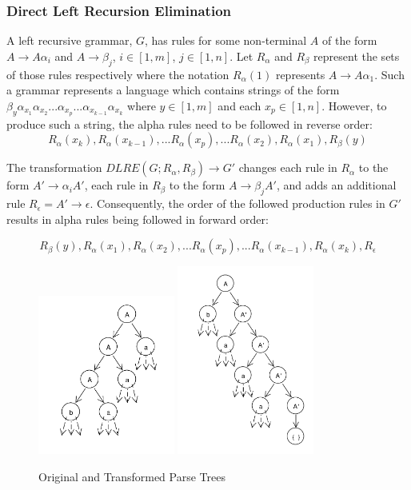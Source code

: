 \documentclass[11pt]{article}
\begin{document}
\subsubsection{Direct Left Recursion Elimination}
A left recursive grammar, $G$, has rules for some non-terminal $A$ of the form
$A \rightarrow A \alpha_i$ and $A \rightarrow \beta_j$, $i \in [1,m]$, $j \in [1,n]$.
Let $R_\alpha$ and $R_\beta$ represent the sets of those rules respectively where the notation
$R_\alpha(1)$ represents $A \rightarrow A \alpha_1$. 
Such a grammar represents a language which contains strings of the form
$\beta_y \alpha_{x_1} \alpha_{x_2} ... \alpha_{x_p}...\alpha_{x_{k-1}} \alpha_{x_k}$ where $y \in [1,m]$ and each $x_p \in [1,n]$.
However, to produce such a string, the alpha rules need to be followed in reverse order:
\[R_\alpha(x_k), R_\alpha(x_{k-1}), ... R_\alpha(x_{p}), ... R_\alpha(x_2), R_\alpha(x_1), R_\beta(y)\]

The transformation \cite{aho} $DLRE(G; R_\alpha, R_\beta) \rightarrow G'$ changes
each rule in $R_\alpha$ to the form $A' \rightarrow \alpha_i A'$, each rule
in $R_\beta$ to the form $A \rightarrow \beta_j A'$, and adds an additional rule
$R_\epsilon = A' \rightarrow \epsilon$. Consequently, the order of the followed production
rules in $G'$ results in alpha rules being followed in forward order:

\[R_\beta(y), R_\alpha(x_1), R_\alpha(x_2), ... R_\alpha(x_p), ... R_\alpha(x_{k-1}),R_\alpha(x_k), R_\epsilon \]


\begin{figure}[h!]
    \centering
    \includegraphics[width=0.4\textwidth,natwidth=1,natheight=1]{umlet/dlre_orig.pdf}
    \includegraphics[width=0.4\textwidth,natwidth=1,natheight=1]{umlet/dlre_comp.pdf}
    \caption{Original and Transformed Parse Trees}
    \label{fig:dlre}
\end{figure}
\end{document}
